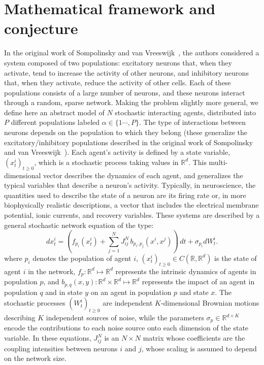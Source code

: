 \documentclass[onefignum,onetabnum]{siamart190516}
\newcommand{\R}{\mathbb{R}}
\newcommand{\1}{\mathbbm{1}}
\newcommand{\review}[1]{\textcolor{midblue}{ #1}}
\renewcommand{\review}[1]{{ #1}}
\begin{document}
\section{Mathematical framework and conjecture}\label{sec:math}
In the original work of Sompolinsky and van Vreeswijk~\cite{sompolinsky-van-vreeswijk}, the authors considered a system composed of two populations: \review{excitatory neurons that, when they activate, tend to increase the activity of other neurons, and inhibitory neurons that, when they activate, reduce the activity of other cells. Each of these populations consists of a large number of neurons, and these neurons interact through a random, sparse network. Making the problem slightly more general, we define here an abstract model of $N$ stochastic interacting agents, distributed into $P$ different populations labeled $\alpha\in\{1\cdots,P\}$. The type of interactions between neurons depends on the population to which they belong (these generalize the excitatory/inhibitory populations described in the original work of Sompolinsky and van Vreeswijk~\cite{sompolinsky-van-vreeswijk}). Each agent's activity is defined by a state variable, $(x^i_t)_{t\geq 0}$, which is a stochastic process taking values in $\R^d$. This multi-dimensional vector describes the dynamics of each agent, and generalizes the typical variables that describe a neuron's activity. Typically, in neuroscience, the quantities used to describe the state of a neuron are its firing rate or, in more biophysically realistic descriptions, a vector that includes the electrical membrane potential, ionic currents, and recovery variables. These systems are described by a general stochastic network equation of the type:}
\begin{equation}\label{eq:general_network}
dx^i_t = \left(f_{p_i}(x^i_t) + \sum_{j=1}^N J^N_{ij} \,b_{p_i,p_j}(x^i,x^j) \right)\,dt+ \sigma_{p_i} dW^i_t. 
\end{equation}
where $p_i$ denotes the population of agent $i$, $(x^i_t)_{t\geq 0} \in C(\R,\R^d)$ is the state of agent $i$ in the network, $f_p:\R^d\mapsto \R^d$ represents the intrinsic dynamics of agents in population $p$, and $b_{p,q}(x,y):\R^d\times \R^d\mapsto \R^d$ represents the impact of an agent in population $q$ and in state $y$ on an agent in population $p$ and state $x$. \review{The stochastic processes $(W^i_t)_{t\geq 0}$ are independent $K$-dimensional Brownian motions describing $K$ independent sources of noise, while the parameters $\sigma_{p} \in \R^{d\times K}$ encode the contributions to each noise source onto each dimension of the state variable. In these equations, $J_{ij}^N$ is an $N\times N$ matrix whose coefficients are the coupling intensities between neurons $i$ and $j$, whose scaling is assumed to depend on the network size.}
\end{document}
